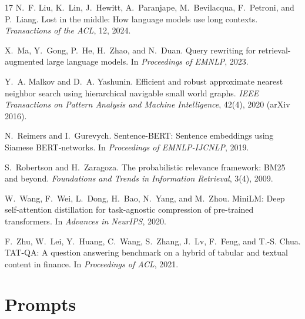 \documentclass[11pt,a4paper]{article}
\begin{document}
\begin{thebibliography}{17}
N.~F. Liu, K.~Lin, J.~Hewitt, A.~Paranjape, M.~Bevilacqua, F.~Petroni, and P.~Liang. Lost in the middle: How language
models use long contexts. \emph{Transactions of the ACL}, 12, 2024.

X.~Ma, Y.~Gong, P.~He, H.~Zhao, and N.~Duan. Query rewriting for retrieval-augmented large language models.
In \emph{Proceedings of EMNLP}, 2023.

Y.~A. Malkov and D.~A. Yashunin. Efficient and robust approximate nearest neighbor search using hierarchical
navigable small world graphs. \emph{IEEE Transactions on Pattern Analysis and Machine Intelligence}, 42(4), 2020
(arXiv 2016).

N.~Reimers and I.~Gurevych. Sentence-BERT: Sentence embeddings using Siamese BERT-networks. In \emph{Proceedings of
EMNLP-IJCNLP}, 2019.

S.~Robertson and H.~Zaragoza. The probabilistic relevance framework: BM25 and beyond. \emph{Foundations and Trends in
Information Retrieval}, 3(4), 2009.

W.~Wang, F.~Wei, L.~Dong, H.~Bao, N.~Yang, and M.~Zhou. MiniLM: Deep self-attention distillation for task-agnostic
compression of pre-trained transformers. In \emph{Advances in NeurIPS}, 2020.

F.~Zhu, W.~Lei, Y.~Huang, C.~Wang, S.~Zhang, J.~Lv, F.~Feng, and T.-S. Chua. TAT-QA: A question answering benchmark on
a hybrid of tabular and textual content in finance. In \emph{Proceedings of ACL}, 2021.
\end{thebibliography}

\appendix
\section{Prompts}
\label{app:prompts}
\end{document}
